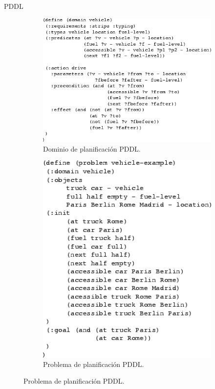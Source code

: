 \documentclass[11pt]{beamer}    %
\begin{document}
    \begin{frame}{PDDL}
        \begin{figure}
            \centering
            \begin{subfigure}[t]{.55\textwidth}
                \centering
                \includegraphics[scale=0.32]{img/presentation/pddl_domain}
                \caption{Dominio de planificación PDDL.}
            \end{subfigure}%
            \begin{subfigure}[t]{.45\textwidth}
                \centering
                \includegraphics[scale=0.32]{img/presentation/pddl_problem}
                \caption{Problema de planificación PDDL.}
            \end{subfigure}
        \end{figure}
    \end{frame}
\end{document}

